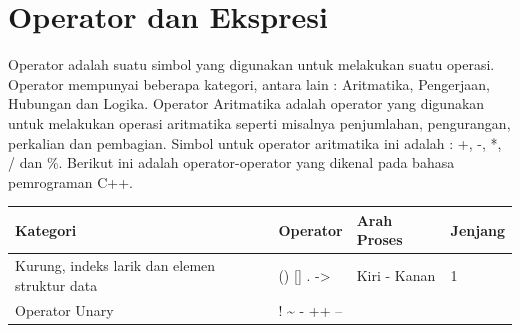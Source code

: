 \section{Operator dan Ekspresi}\label{operator-dan-ekspresi}

Operator adalah suatu simbol yang digunakan untuk melakukan suatu
operasi. Operator mempunyai beberapa kategori, antara lain : Aritmatika,
Pengerjaan, Hubungan dan Logika. Operator Aritmatika adalah operator
yang digunakan untuk melakukan operasi aritmatika seperti misalnya
penjumlahan, pengurangan, perkalian dan pembagian. Simbol untuk operator
aritmatika ini adalah : +, -, *, / dan \%. Berikut ini adalah
operator-operator yang dikenal pada bahasa pemrograman C++.

\begin{longtable}[]{@{}llll@{}}
\toprule
\begin{minipage}[b]{0.52\columnwidth}\raggedright\strut
Kategori
\strut\end{minipage} &
\begin{minipage}[b]{0.17\columnwidth}\raggedright\strut
Operator
\strut\end{minipage} &
\begin{minipage}[b]{0.14\columnwidth}\raggedright\strut
Arah Proses
\strut\end{minipage} &
\begin{minipage}[b]{0.05\columnwidth}\raggedright\strut
Jenjang
\strut\end{minipage}\tabularnewline
\midrule
\endhead
\begin{minipage}[t]{0.52\columnwidth}\raggedright\strut
Kurung, indeks larik dan elemen struktur data
\strut\end{minipage} &
\begin{minipage}[t]{0.17\columnwidth}\raggedright\strut
() {[}{]} . -\textgreater{}
\strut\end{minipage} &
\begin{minipage}[t]{0.14\columnwidth}\raggedright\strut
Kiri - Kanan
\strut\end{minipage} &
\begin{minipage}[t]{0.05\columnwidth}\raggedright\strut
1
\strut\end{minipage}\tabularnewline
\begin{minipage}[t]{0.52\columnwidth}\raggedright\strut
Operator Unary
\strut\end{minipage} &
\begin{minipage}[t]{0.17\columnwidth}\raggedright\strut
! \textasciitilde{} - ++ --
\strut\end{minipage} &

\end{longtable}

